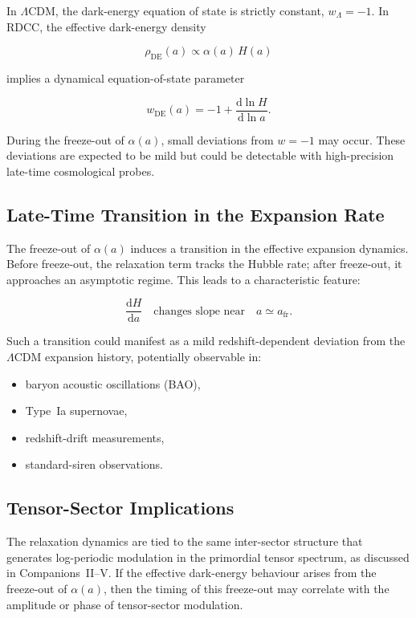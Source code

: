 \documentclass[11pt,a4paper]{article}
\newcommand{\Ha}{H(a)}
\newcommand{\alphaR}{\alpha}
\newcommand{\dd}{\mathrm{d}}
\begin{document}
In $\Lambda$CDM, the dark-energy equation of state is strictly constant,
$w_{\Lambda} = -1$. In RDCC, the effective dark-energy density


\[
\rho_{\mathrm{DE}}(a) \propto \alphaR(a)\,\Ha
\]


implies a dynamical equation-of-state parameter


\[
w_{\mathrm{DE}}(a)
    = -1 + \frac{\dd\ln H}{\dd\ln a}.
\]


During the freeze-out of $\alphaR(a)$, small deviations from $w = -1$ may occur.
These deviations are expected to be mild but could be detectable with
high-precision late-time cosmological probes.

\subsection{Late-Time Transition in the Expansion Rate}

The freeze-out of $\alphaR(a)$ induces a transition in the effective expansion
dynamics. Before freeze-out, the relaxation term tracks the Hubble rate; after
freeze-out, it approaches an asymptotic regime. This leads to a characteristic
feature:


\[
\frac{\dd H}{\dd a}
\quad\text{changes slope near}\quad a \simeq a_{\mathrm{fr}}.
\]


Such a transition could manifest as a mild redshift-dependent deviation from the
$\Lambda$CDM expansion history, potentially observable in:
\begin{itemize}
    \item baryon acoustic oscillations (BAO),
    \item Type~Ia supernovae,
    \item redshift-drift measurements,
    \item standard-siren observations.
\end{itemize}

\subsection{Tensor-Sector Implications}

The relaxation dynamics are tied to the same inter-sector structure that
generates log-periodic modulation in the primordial tensor spectrum, as
discussed in Companions~II–V. If the effective dark-energy behaviour arises from
the freeze-out of $\alphaR(a)$, then the timing of this freeze-out may correlate
with the amplitude or phase of tensor-sector modulation.
\end{document}
